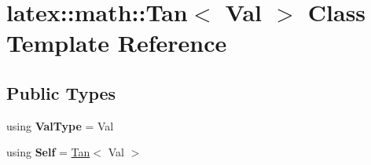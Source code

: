 \hypertarget{classlatex_1_1math_1_1Tan}{\section{latex\-:\-:math\-:\-:Tan$<$ Val $>$ Class Template Reference}
\label{classlatex_1_1math_1_1Tan}
}
\subsection*{Public Types}
\begin{DoxyCompactItemize}
\item 
\hypertarget{classlatex_1_1math_1_1Tan_a29b8484f49220656417330480ff379a1}{using {\bfseries Val\-Type} = Val}\label{classlatex_1_1math_1_1Tan_a29b8484f49220656417330480ff379a1}

\item 
\hypertarget{classlatex_1_1math_1_1Tan_a2c6238e3514773fdc2c6ce83e92cfdf5}{using {\bfseries Self} = \hyperlink{classlatex_1_1math_1_1Tan}{Tan}$<$ Val $>$}\label{classlatex_1_1math_1_1Tan_a2c6238e3514773fdc2c6ce83e92cfdf5}

\end{DoxyCompactItemize}
